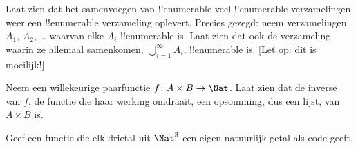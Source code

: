 \documentclass[openany]{memoir}
\begin{document}
\begin{prob}
Laat zien dat het samenvoegen van !!{enumerable} veel !!{enumerable}
verzamelingen weer een !!{enumerable} verzameling oplevert. Precies
gezegd: neem verzamelingen $A_1$, $A_2$, \dots{} waarvan elke $A_i$
!!{enumerable} is. Laat zien dat ook de verzameling waarin ze allemaal
samenkomen, $\bigcup_{i=1}^\infty A_i$, !!{enumerable} is. [Let op: dit
is moeilijk!]
\end{prob}

\begin{prob}
Neem een willekeurige paarfunctie $f \colon A \times B \to \Nat$.
Laat zien dat de inverse van $f$, de functie die haar werking omdraait,
een opsomming, dus een lijst, van $A \times B$ is.
\end{prob}

\begin{prob}
Geef een functie die elk drietal uit $\Nat^3$ een eigen natuurlijk
getal als code geeft.
\end{prob}
\endgroup

\begingroup
\def\olfilename{OLP-0032}
\def\olfilepath{content/sets-functions-relations/size-of-sets/}
\hypertarget{unit-OLP-0032}{}




\end{document}
